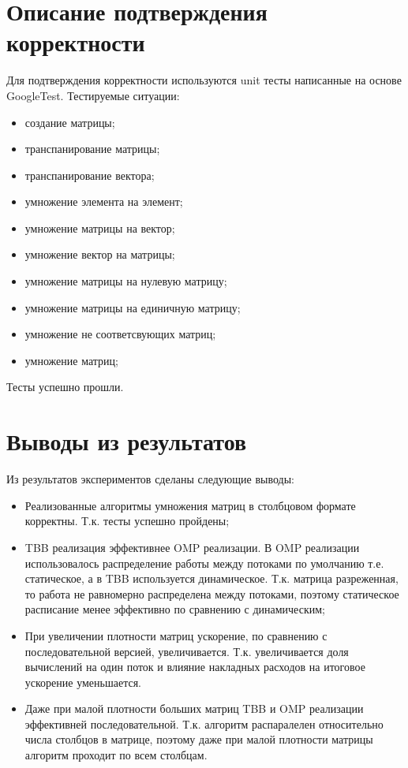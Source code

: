 \documentclass{report}
\begin{document}
\section*{Описание подтверждения корректности}
\par Для подтверждения корректности используются unit тесты написанные на основе GoogleTest. Тестируемые ситуации:
\begin{itemize}
	\item создание матрицы;
	\item транспанирование матрицы;
	\item транспанирование вектора;
	\item умножение элемента на элемент;
	\item умножение матрицы на вектор;
	\item умножение вектор на матрицы;
	\item умножение матрицы на нулевую матрицу;
	\item умножение матрицы на единичную матрицу;
	\item умножение не соответсвующих матриц;
	\item умножение матриц;
\end{itemize}
\par Тесты успешно прошли.
\newpage

\section*{Выводы из результатов}
\par Из результатов экспериментов сделаны следующие выводы:
\begin{itemize}
	\item Реализованные алгоритмы умножения матриц в столбцовом формате корректны. Т.к. тесты успешно пройдены;
	\item TBB реализация эффективнее OMP реализации. В OMP реализации использовалось распределение работы между потоками по умолчанию т.е. статическое, а в TBB используется динамическое. Т.к. матрица разреженная, то работа не равномерно распределена между потоками, поэтому статическое расписание менее эффективно по сравнению с динамическим;
	\item При увеличении плотности матриц ускорение, по сравнению с последовательной версией, увеличивается. Т.к. увеличивается доля вычислений на один поток и влияние накладных расходов на итоговое ускорение уменьшается.
	\item Даже при малой плотности больших матриц TBB и OMP реализации эффективней последовательной. Т.к. алгоритм распаралелен относительно числа столбцов в матрице, поэтому даже при малой плотности матрицы алгоритм проходит по всем столбцам.
\end{itemize}
\newpage
\end{document}
